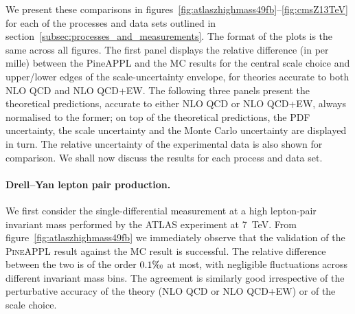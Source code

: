 We present these comparisons in
figures~\ref{fig:atlaszhighmass49fb}--\ref{fig:cmsZ13TeV} for each of the processes
and data sets outlined in section~\ref{subsec:processes_and_measurements}.
The format of the plots is the same across all figures. The first panel
displays the relative difference (in per mille) between the {\sc PineAPPL} and
the MC results for the central scale choice and upper/lower edges of the
scale-uncertainty envelope, for
theories accurate to both NLO QCD and NLO QCD+EW. The following three panels
present the theoretical predictions, accurate to either NLO QCD or NLO QCD+EW,
always normalised to the former; on top of the theoretical predictions, the
PDF uncertainty, the scale uncertainty and the Monte Carlo uncertainty are
displayed in turn. The relative uncertainty of the experimental data is
also shown for comparison. We shall now discuss the results for each
process and data set.

\paragraph{Drell--Yan lepton pair production.} 

We first consider the single-differential measurement at a high lepton-pair
invariant mass performed by the ATLAS experiment at \SI{7}{\tera\electronvolt}.
From figure~\ref{fig:atlaszhighmass49fb} we immediately
observe that the validation of the \textsc{PineAPPL} result against the MC
result is successful. The relative difference between the two is of the order
$0.1\tcperthousand$ at most, with negligible fluctuations across different
invariant mass bins. The agreement is similarly good irrespective of the
perturbative accuracy of the theory (NLO QCD or NLO QCD+EW) or of the scale
choice.

